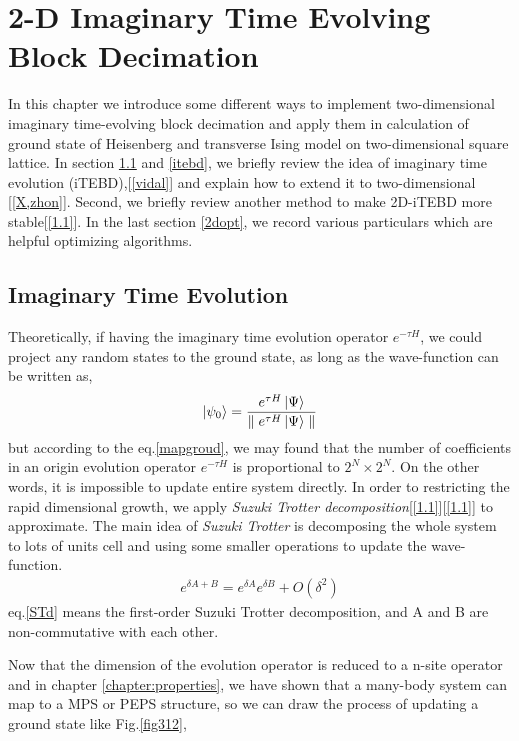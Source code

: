 \chapter{2-D Imaginary Time Evolving Block Decimation}
\label{chapter:2ditebd}

In this chapter we introduce some different ways to implement two-dimensional imaginary time-evolving block decimation and apply them in calculation of ground state of Heisenberg and transverse Ising model on two-dimensional square lattice. In section \ref{ite} and \ref{itebd}, we briefly review the idea of imaginary time evolution (iTEBD),[\ref{vidal}] and explain how to extend it to two-dimensional [\ref{X,zhon}]. Second, we briefly review another method to make 2D-iTEBD more stable[\ref{1.1}]. In the last section \ref{2dopt}, we record various particulars which are helpful optimizing algorithms.

\section{Imaginary Time Evolution}
\label{ite}
Theoretically, if having the imaginary time evolution operator $e^{-\tau H}$, we could project any random states to the ground state, as long as the wave-function can be written as,
\begin{align}
	\label{mapgroud}
	\Ket{\psi_0} = \frac{e^{\tau H} \Ket{\Psi}}{\parallel e^{\tau H} \Ket{\Psi}\parallel}
\end{align}
but according to the eq.\ref{mapgroud}, we may found that the number of coefficients in an origin evolution operator $e^{-\tau H}$ is proportional to $2^N \times 2^N$. On the other words, it is impossible to update entire system directly. In order to restricting the rapid dimensional growth, we apply \textit{Suzuki Trotter decomposition}[\ref{1.1}][\ref{1.1}] to approximate. The main idea of \textit{Suzuki Trotter} is decomposing the whole system to lots of units cell and using some smaller operations to update the wave-function.
\begin{align}
	\label{STd}
	e^{\delta A + B} = e^{\delta A}e^{\delta B} + O(\delta^2)
\end{align}
eq.\ref{STd} means the first-order Suzuki Trotter  decomposition, and A and B are non-commutative with each other.

Now that the dimension of the evolution operator is reduced to a n-site operator and in chapter \ref{chapter:properties}, we have shown that a many-body system can map to a MPS or PEPS structure, so we can draw the process of updating a ground state like Fig.\ref{fig312},

